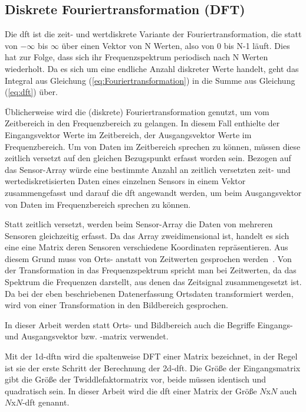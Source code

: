 \subsection{Diskrete Fouriertransformation (DFT)}\label{sec:dft}

Die \gls{dft} ist die zeit- und wertdiskrete Variante der Fouriertransformation, die statt von $-\infty$ bis $\infty$ über einen Vektor von N Werten, also von 0 bis N-1 läuft. 
Dies hat zur Folge, dass sich ihr Frequenzspektrum periodisch nach N Werten wiederholt.
Da es sich um eine endliche Anzahl diskreter Werte handelt, geht das Integral aus Gleichung (\ref{eq:Fouriertransformation}) in die Summe aus Gleichung (\ref{eq:dft}) über. 


Üblicherweise wird die (diskrete) Fouriertransformation genutzt, um vom Zeitbereich in den Frequenzbereich zu gelangen. In diesem Fall enthielte der Eingangsvektor 
Werte im Zeitbereich, der Ausgangsvektor Werte im Frequenzbereich.
Um von Daten im Zeitbereich sprechen zu können, müssen diese zeitlich versetzt auf den gleichen Bezugspunkt erfasst worden sein. 
Bezogen auf das Sensor-Array würde eine bestimmte Anzahl an zeitlich versetzten zeit- und wertediskretisierten Daten eines einzelnen Sensors in einem Vektor zusammengefasst 
und darauf die \gls{dft} angewandt werden, um beim Ausgangsvektor von Daten im Frequenzbereich sprechen zu können.

Statt zeitlich versetzt, werden beim Sensor-Array die Daten von mehreren Sensoren gleichzeitig erfasst. Da das Array zweidimensional ist, handelt es sich eine eine Matrix deren Sensoren verschiedene Koordinaten repräsentieren.
Aus diesem Grund muss von Orts- anstatt von
Zeitwerten gesprochen werden~\autocite[69]{toennis2005bildverabeitung}. Von der Transformation in das Frequenzspektrum spricht man bei Zeitwerten, da das Spektrum die Frequenzen darstellt, aus denen das Zeitsignal 
zusammengesetzt ist. Da bei der eben beschriebenen Datenerfassung Ortsdaten transformiert werden, wird von einer Transformation in den Bildbereich gesprochen. 

In dieser Arbeit werden statt Orts- und Bildbereich auch die Begriffe Eingangs- und Ausgangsvektor bzw. -matrix verwendet.

Mit der \gls{1d-dftn} wird die spaltenweise DFT einer Matrix bezeichnet, in der Regel ist sie der erste Schritt der Berechnung der \gls{2d-dft}. 
Die Größe der Eingangsmatrix gibt die Größe der Twiddlefaktormatrix vor, beide müssen identisch und
quadratisch sein. In dieser Arbeit wird die \gls{dft} einer Matrix der Größe $N$x$N$ auch $N$x$N$-\gls{dft} genannt.


